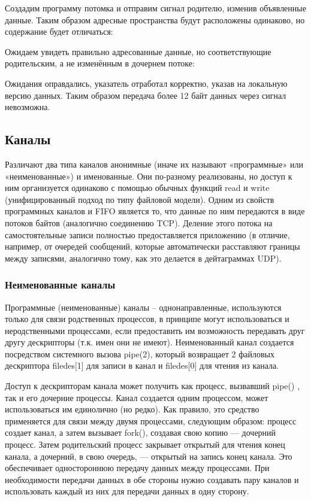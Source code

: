 \documentclass[a4paper]{article}
\begin{document}
	Создадим программу потомка и отправим сигнал родителю, изменив объявленные данные. Таким образом адресные пространства будут расположены одинаково, но содержание будет отличаться:
		
		Ожидаем увидеть правильно адресованные данные, но соответствующие родительским, а не изменённым в дочернем потоке:
		
		Ожидания оправдались, указатель отработал корректно, указав на локальную версию данных. Таким образом передача более 12 байт данных через сигнал невозможна.	

\subsection{Каналы}
	Различают два типа каналов анонимные (иначе их называют «программные» или «неименованные») и именованные. Они по-разному реализованы, но доступ к ним организуется одинаково с помощью обычных функций read и write (унифицированный подход по типу файловой модели). Одним из свойств программных каналов и FIFO является то, что данные по ним передаются в виде потоков байтов (аналогично соединению TCP). Деление этого потока на самостоятельные записи полностью предоставляется приложению (в отличие, например, от очередей сообщений, которые автоматически расставляют границы между записями, аналогично тому, как это делается в дейтаграммах UDP).
		
	\subsubsection{Неименованные каналы}
	Программные (неименованные) каналы – однонаправленные, используются только для связи родственных процессов, в принципе могут использоваться и неродственными процессами, если предоставить им возможность передавать друг другу дескрипторы (т.к. имен они не имеют). Неименованный канал создается посредством системного вызова pipe(2), который возвращает 2 файловых дескриптора filedes[1] для записи в канал и filedes[0] для чтения из канала.
	
	Доступ к дескрипторам канала может получить как процесс, вызвавший pipe() , так и его дочерние процессы. Канал создается одним процессом, может использоваться им единолично (но редко). Как правило, это средство применяется для связи между двумя процессами, следующим образом: процесс создает канал, а затем вызывает fork(), создавая свою копию — дочерний процесс. Затем родительский процесс закрывает открытый для чтения конец канала, а дочерний, в свою очередь, — открытый на запись конец канала. Это обеспечивает одностороннюю передачу данных между процессами. При необходимости передачи данных в обе стороны нужно создавать пару каналов и использовать каждый из них для передачи данных в одну сторону.
	
\end{document}

